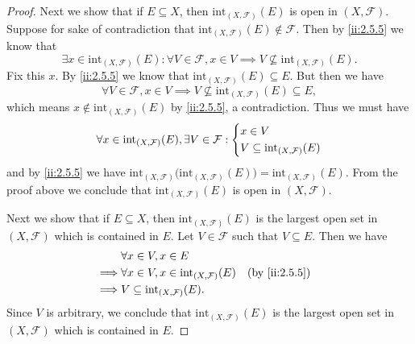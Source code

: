\begin{proof}
  Next we show that if \(E \subseteq X\), then \(\text{int}_{(X, \mathcal{F})}(E)\) is open in \((X, \mathcal{F})\).
  Suppose for sake of contradiction that \(\text{int}_{(X, \mathcal{F})}(E) \notin \mathcal{F}\).
  Then by \cref{ii:2.5.5} we know that
  \[
    \exists x \in \text{int}_{(X, \mathcal{F})}(E) : \forall V \in \mathcal{F}, x \in V \implies V \not\subseteq \text{int}_{(X, \mathcal{F})}(E).
  \]
  Fix this \(x\).
  By \cref{ii:2.5.5} we know that \(\text{int}_{(X, \mathcal{F})}(E) \subseteq E\).
  But then we have
  \[
    \forall V \in \mathcal{F}, x \in V \implies V \not\subseteq \text{int}_{(X, \mathcal{F})}(E) \subseteq E,
  \]
  which means \(x \notin \text{int}_{(X, \mathcal{F})}(E)\) by \cref{ii:2.5.5}, a contradiction.
  Thus we must have
  \[
    \forall x \in \text{int}_{(X, \mathcal{F})}(E), \exists V \in \mathcal{F} : \begin{dcases}
      x \in V \\
      V \subseteq \text{int}_{(X, \mathcal{F})}(E)
    \end{dcases}
  \]
  and by \cref{ii:2.5.5} we have \(\text{int}_{(X, \mathcal{F})}\big(\text{int}_{(X, \mathcal{F})}(E)\big) = \text{int}_{(X, \mathcal{F})}(E)\).
  From the proof above we conclude that \(\text{int}_{(X, \mathcal{F})}(E)\) is open in \((X, \mathcal{F})\).

  Next we show that if \(E \subseteq X\), then \(\text{int}_{(X, \mathcal{F})}(E)\) is the largest open set in \((X, \mathcal{F})\) which is contained in \(E\).
  Let \(V \in \mathcal{F}\) such that \(V \subseteq E\).
  Then we have
  \begin{align*}
             & \forall x \in V, x \in E                                                \\
    \implies & \forall x \in V, x \in \text{int}_{(X, \mathcal{F})}(E) &  & \by{ii:2.5.5} \\
    \implies & V \subseteq \text{int}_{(X, \mathcal{F})}(E).
  \end{align*}
  Since \(V\) is arbitrary, we conclude that \(\text{int}_{(X, \mathcal{F})}(E)\) is the largest open set in \((X, \mathcal{F})\) which is contained in \(E\).


\end{proof}
